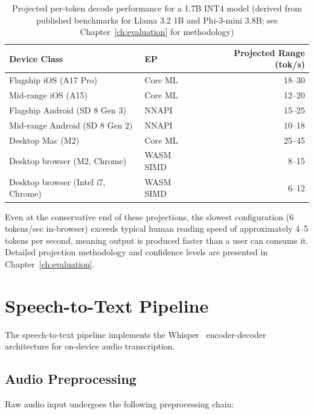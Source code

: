 \documentclass[12pt, letterpaper, twoside]{report}
\begin{document}
\begin{table}[H]
\centering
\caption{Projected per-token decode performance for a 1.7B INT4 model (derived from published benchmarks for Llama 3.2 1B and Phi-3-mini 3.8B; see Chapter~\ref{ch:evaluation} for methodology)}
\label{tab:per_token_latency}
\begin{tabular}{@{}llr@{}}
\toprule
\textbf{Device Class} & \textbf{EP} & \textbf{Projected Range (tok/s)} \\
\midrule
Flagship iOS (A17 Pro) & Core ML & 18--30 \\
Mid-range iOS (A15) & Core ML & 12--20 \\
Flagship Android (SD 8 Gen 3) & NNAPI & 15--25 \\
Mid-range Android (SD 8 Gen 2) & NNAPI & 10--18 \\
Desktop Mac (M2) & Core ML & 25--45 \\
Desktop browser (M2, Chrome) & WASM SIMD & 8--15 \\
Desktop browser (Intel i7, Chrome) & WASM SIMD & 6--12 \\
\bottomrule
\end{tabular}
\end{table}

Even at the conservative end of these projections, the slowest configuration (6 tokens/sec in-browser) exceeds typical human reading speed of approximately 4--5 tokens per second, meaning output is produced faster than a user can consume it. Detailed projection methodology and confidence levels are presented in Chapter~\ref{ch:evaluation}.

\section{Speech-to-Text Pipeline}
\label{sec:stt}

The speech-to-text pipeline implements the Whisper~\cite{radford2023robust} encoder-decoder architecture for on-device audio transcription.

\subsection{Audio Preprocessing}
\label{subsec:audio_preprocessing}

Raw audio input undergoes the following preprocessing chain:
\end{document}
